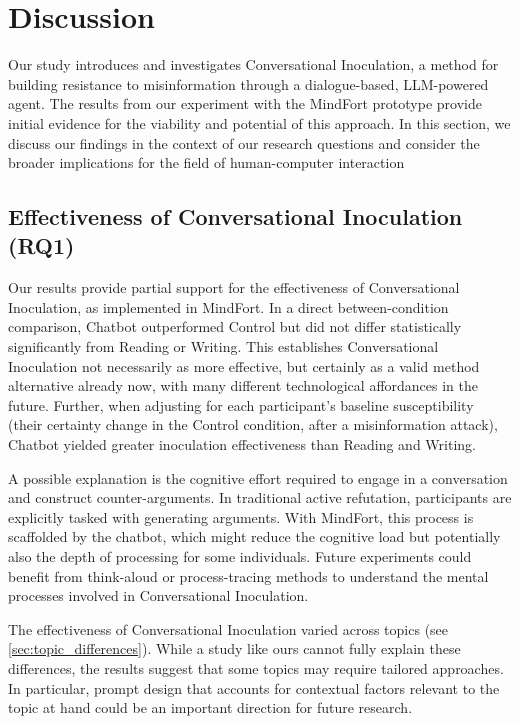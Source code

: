 \documentclass[sigconf]{acmart}
\begin{document}
\section{Discussion}

Our study introduces and investigates Conversational Inoculation, a method for building resistance to misinformation through a dialogue-based, LLM-powered agent. 
The results from our experiment with the MindFort prototype provide initial evidence for the viability and potential of this approach.
In this section, we discuss our findings in the context of our research questions and consider the broader implications for the field of human-computer interaction

\subsection{Effectiveness of Conversational Inoculation (RQ1)}
Our results provide partial support for the effectiveness of Conversational Inoculation, as implemented in MindFort.
In a direct between-condition comparison, Chatbot outperformed Control but did not differ statistically significantly from Reading or Writing.
This establishes Conversational Inoculation not necessarily as more effective, but certainly as a valid method alternative already now, with many different technological affordances in the future.
Further, when adjusting for each participant’s baseline susceptibility (their certainty change in the Control condition, after a misinformation attack), Chatbot yielded greater inoculation effectiveness than Reading and Writing.

A possible explanation is the cognitive effort required to engage in a conversation and construct counter-arguments.
In traditional active refutation, participants are explicitly tasked with generating arguments.
With MindFort, this process is scaffolded by the chatbot, which might reduce the cognitive load but potentially also the depth of processing for some individuals.
Future experiments could benefit from think-aloud or process-tracing methods to understand the mental processes involved in Conversational Inoculation.

The effectiveness of Conversational Inoculation varied across topics (see \autoref{sec:topic_differences}). While a study like ours cannot fully explain these differences, the results suggest that some topics may require tailored approaches.
In particular, prompt design that accounts for contextual factors relevant to the topic at hand could be an important direction for future research.
\end{document}
